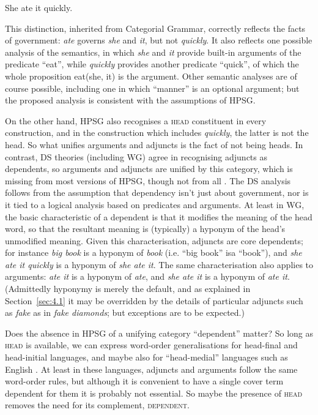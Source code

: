 \documentclass[output=paper]{langscibook}
\begin{document}
\begin{exe}
	\ex \label{ex:33} She ate it quickly.
\end{exe}

This distinction, inherited from Categorial Grammar, correctly reflects the facts of government: \emph{ate} governs \emph{she} and \emph{it}, but not \emph{quickly}. It also reflects one possible analysis of the semantics, in which \emph{she} and \emph{it} provide built-in arguments of the predicate ``eat'', while \emph{quickly} provides another predicate ``quick'', of which the whole proposition eat(she, it) is the argument. Other semantic analyses are of course possible, including one in which ``manner'' is an optional argument; but the proposed analysis is consistent with the assumptions of HPSG.

On the other hand, HPSG also recognises a \textsc{head} constituent in every construction, and in the construction which includes \emph{quickly}, the latter is not the head. So what unifies arguments and adjuncts is the fact of not being heads. In contrast, DS theories (including WG) agree in recognising adjuncts as dependents, so arguments and adjuncts are unified by this category, which is missing from most versions of HPSG, though not from all \citep{BMS2001a}. The DS analysis follows from the assumption that dependency isn’t just about government, nor is it tied to a logical analysis based on predicates and arguments. At least in WG, the basic characteristic of a dependent is that it modifies the meaning of the head word, so that the resultant meaning is (typically) a hyponym of the head’s unmodified meaning. Given this characterisation, adjuncts are core dependents; for instance \emph{big book} is a hyponym of \emph{book} (i.e. ``big book'' isa ``book''), and \emph{she ate it quickly} is a hyponym of \emph{she ate it}. The same characterisation also applies to arguments: \emph{ate it} is a hyponym of \emph{ate}, and \emph{she ate it} is a hyponym of \emph{ate it}. (Admittedly hyponymy is merely the default, and as explained in Section~\ref{sec:4.1} it may be overridden by the details of particular adjuncts such as \emph{fake} as in \emph{fake diamonds}; but exceptions are to be expected.)

Does the absence in HPSG of a unifying category ``dependent'' matter? So long as \textsc{head} is available, we can express word-order generalisations for head-final and head-initial languages, and maybe also for ``head-medial'' languages such as English \citep[172]{Hudson2010b-u}. At least in these languages, adjuncts and arguments follow the same word-order rules, but although it is convenient to have a single cover term dependent for them it is probably not essential. So maybe the presence of \textsc{head} removes the need for its complement, \textsc{dependent}.
\end{document}
